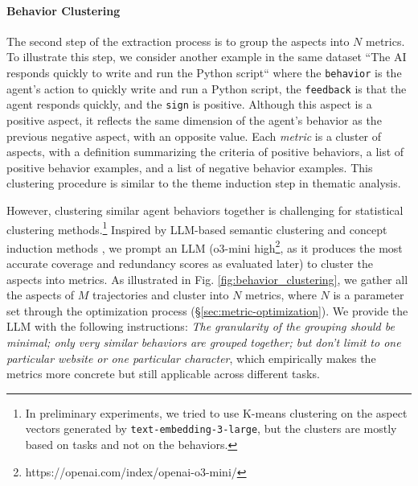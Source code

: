 \paragraph{Behavior Clustering}
The second step of the extraction process is to group the aspects into $N$ metrics.
To illustrate this step, we consider another example in the same dataset
\textsf{``The AI responds quickly to write and run the Python script``} where
the \texttt{behavior} is the agent's action to quickly write and run a Python script, the \texttt{feedback}
is that the agent responds quickly, and the \texttt{sign} is positive. Although this aspect is a positive aspect,
it reflects the same dimension of the agent's behavior as the previous negative aspect, with an opposite value.
Each \emph{metric} is a cluster of aspects, with a definition summarizing the criteria of positive behaviors, a list of positive behavior examples, and a list of negative behavior examples. This clustering procedure
is similar to the theme induction step in thematic analysis.

However, clustering similar agent behaviors together is challenging for statistical clustering methods.\footnote{
    In preliminary experiments, we tried to use K-means clustering on the aspect vectors generated by \texttt{text-embedding-3-large},
    but the clusters are mostly based on tasks and not on the behaviors.
}
Inspired by LLM-based semantic clustering and concept induction methods \citet{viswanathan2024large,lam2024concept}, we prompt an LLM (o3-mini high\footnote{https://openai.com/index/openai-o3-mini/}, as it produces the most accurate coverage and redundancy scores as evaluated later) 
to cluster the aspects into metrics. 
As illustrated in Fig. \ref{fig:behavior_clustering},
we gather all the aspects of $M$ trajectories
and cluster into $N$ metrics, where $N$ is a parameter set through the optimization process (\S\ref{sec:metric-optimization}).
We provide the LLM with the following instructions:
\emph{The granularity of the grouping should be minimal; only very similar behaviors are grouped together; but don't limit to one particular website or one particular character}, which empirically
makes the metrics more concrete but still applicable across different tasks.


